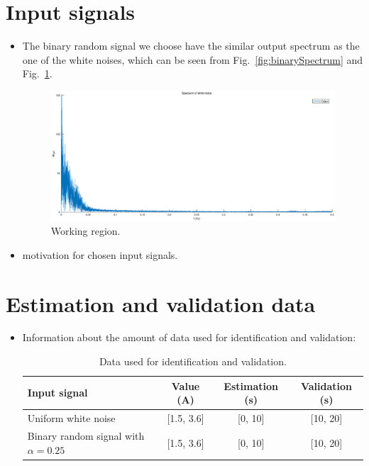 \documentclass[10pt,a4paper]{article}
\begin{document}
\section{Input signals}
\begin{itemize}
    \item The binary random signal we choose have the similar output spectrum as the one of the white noises, which can be seen from Fig.~\ref{fig:binarySpectrum} and Fig.~\ref{fig:whiteNoiseSpectrum}.
    \begin{figure}[h]
		\footnotesize
		\centering
		\includegraphics[width=0.8\columnwidth]{whiteNoiseSpectrum.eps} 
		\caption{Working region.}
		\label{fig:whiteNoiseSpectrum}
	\end{figure}
    \item motivation for chosen input signals.
\end{itemize}

\section{Estimation and validation data}
\begin{itemize}
    \item Information about the amount of data used for identification and validation:
    \begin{table}[h]
	    \footnotesize
    	\centering
    	\caption{Data used for identification and validation.}
    	\label{table:data}
    	\begin{tabular}{lccc}
    	\hline
    	Input signal & Value (A) & Estimation (s) & Validation (s) \\
    	\hline
    	Uniform white noise & [1.5, 3.6] & [0, 10] & [10, 20] \\
    	Binary random signal with $\alpha = 0.25$ & [1.5, 3.6] & [0, 10] & [10, 20] \\
    	\hline
    	\end{tabular}
    \end{table}
\end{itemize}
\end{document}
